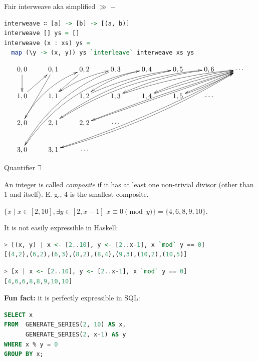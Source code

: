 \documentclass[handout]{beamer}
\begin{document}
\begin{frame}[fragile]{Fair interweave aka simplified $\gg\!\!-$}

\begin{lstlisting}[language=Haskell]
interweave ∷ [a] -> [b] -> [(a, b)]
interweave [] ys = []
interweave (x : xs) ys =
  map (\y -> (x, y)) ys `interleave` interweave xs ys
\end{lstlisting}

$$\xymatrix{
0,0 \ar[d]              & 0,1 \ar[ddl]     & 0,2 \ar[dl]  & 0,3 \ar@/_1.4pc/[dddlll] & 0,4 \ar@/_0.5pc/[dll] & 0,5 \ar@/_1pc/[ddllll] & 0,6 \ar@/_0.5pc/[dlll] & \cdots \ar@/_0.5pc/[dlll] \ar@/_0.2pc/[ddlllll] \ar[dll] \ar@/^0.6pc/[dddllllll] \\
1,0 \ar[ur]             & 1,1 \ar@/^0.5pc/[urr]     & 1,2 \ar@/^0.5pc/[urrr] & 1,3 \ar@/^0.5pc/[urrrr]       & 1,4 \ar@/^0.2pc/[urrr] & 1,5 \ar@/_0.2pc/[urr] & \cdots \\
2,0 \ar@/^1pc/[uurr]    & 2,1 \ar@/^1.3pc/[uurrrrr]   & 2,2 \ar[uurrrrr]  & \cdots \\
3,0 \ar@/^2pc/[uuurrrr] & 3,1 \ar@/_0.9pc/[uuurrrrrr] & \cdots \\
}$$

\end{frame}

\begin{frame}[fragile]{Quantifier $\exists$}
\begin{adjustwidth}{-1em}{-1em}

An integer is called {\em composite} if it has at least one non-trivial divisor (other than 1 and itself). E. g., 4 is the smallest composite.

\bigskip

$ \{ x \mid x \in [2, 10], \exists y \in [2, x-1] \,\, x \equiv 0 \pmod y \} =
\{ 4,6,8,9,10 \}$.

\bigskip

\pause

It is not easily expressible in Haskell:
\begin{lstlisting}[language=Haskell]
> [(x, y) | x <- [2..10], y <- [2..x-1], x `mod` y == 0]
[(4,2),(6,2),(6,3),(8,2),(8,4),(9,3),(10,2),(10,5)]
\end{lstlisting}

\pause

\begin{lstlisting}[language=Haskell]
> [x | x <- [2..10], y <- [2..x-1], x `mod` y == 0]
[4,6,6,8,8,9,10,10]
\end{lstlisting}

\pause

{\bf Fun fact:} it is perfectly expressible in SQL:
\begin{lstlisting}[language=SQL]
SELECT x
FROM  GENERATE_SERIES(2, 10) AS x,
      GENERATE_SERIES(2, x-1) AS y
WHERE x % y = 0
GROUP BY x;
\end{lstlisting}

\end{adjustwidth}
\end{frame}
\end{document}
